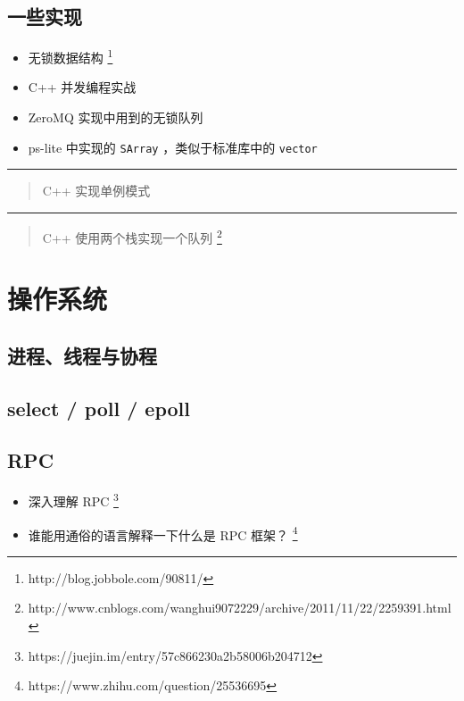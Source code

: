 \subsection{一些实现}\label{subsec:some-implementation}

\begin{itemize}
\item 无锁数据结构%
  \footnote{http://blog.jobbole.com/90811/}%
\item C++ 并发编程实战
\item ZeroMQ 实现中用到的无锁队列
\item ps-lite 中实现的 \verb|SArray| ，类似于标准库中的 \verb|vector|
\end{itemize}


\noindent\rule[0.25\baselineskip]{\textwidth}{1pt}

\begin{quotation}
  {\color{red}C++ 实现单例模式}
\end{quotation}


\noindent\rule[0.25\baselineskip]{\textwidth}{1pt}

\begin{quotation}
  {\color{red}C++ 使用两个栈实现一个队列}%
  \footnote{http://www.cnblogs.com/wanghui9072229/archive/2011/11/22/2259391.html}%
\end{quotation}


\section{操作系统}\label{sec:os-related}

\subsection{进程、线程与协程}


\subsection{select / poll / epoll}


\subsection{RPC}

\begin{itemize}
\item 深入理解 RPC%
  \footnote{https://juejin.im/entry/57c866230a2b58006b204712}%
\item 谁能用通俗的语言解释一下什么是 RPC 框架？%
  \footnote{https://www.zhihu.com/question/25536695}%
\end{itemize}


